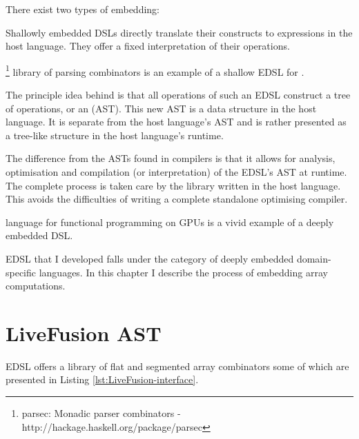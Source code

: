 \documentclass[preamble.tex]{subfiles}
\begin{document}
There exist two types of embedding:
\begin{description}
\item {}

Shallowly embedded DSLs directly translate their constructs to expressions in the host language. They offer a fixed interpretation of their operations.

\footnote{parsec: Monadic parser combinators - http://hackage.haskell.org/package/parsec} library of parsing combinators is an example of a shallow EDSL for \Haskell.

\item {} 

The principle idea behind  is that all operations of such an EDSL construct a tree of operations, or an  (AST)\iast{}. This new AST is a data structure in the host language. It is separate from the host language's AST and is rather presented as a tree-like structure in the host language's runtime.

The difference from the ASTs found in compilers is that it allows for analysis, optimisation and compilation (or interpretation) of the EDSL's AST at runtime. The complete process is taken care by the library written in the host language. This avoids the difficulties of writing a complete standalone optimising compiler.

 language for functional programming on GPUs \cite{CKL+11} is a vivid example of a deeply embedded DSL.
\end{description}

\LiveFusion EDSL that I developed falls under the category of deeply embedded domain-specific languages. In this chapter I describe the process of embedding array computations.


\clearpage

\section{LiveFusion AST}

\LiveFusion EDSL offers a library of flat and segmented\isegmented{} array combinators\icomb{} some of which are presented in Listing \ref{lst:LiveFusion-interface}.
\end{document}
